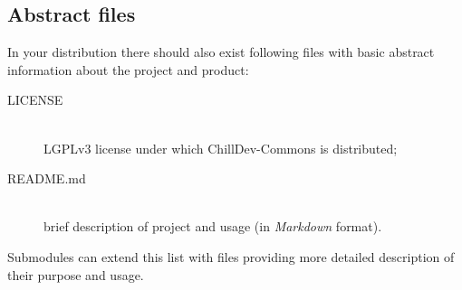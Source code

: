 \subsection{Abstract files}

In your distribution there should also exist following files with basic abstract information about the project and product:

\begin{description}
    \item[LICENSE] \hfill \\
    LGPLv3 license under which ChillDev-Commons is distributed;

    \item[README.md] \hfill \\
    brief description of project and usage (in \emph{Markdown} format).
\end{description}

Submodules can extend this list with files providing more detailed description of their purpose and usage.
